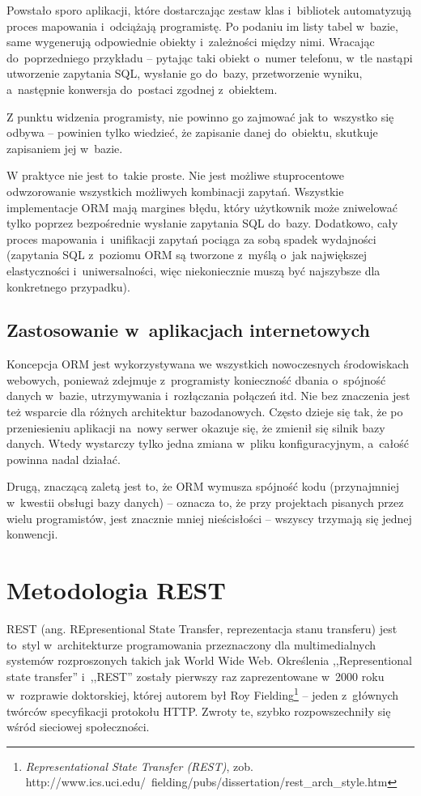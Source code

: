 \documentclass[a4paper,12pt,oneside]{report}
\begin{document}
Powstało sporo aplikacji, które dostarczając zestaw klas i~bibliotek automatyzują proces mapowania i~odciążają programistę. Po podaniu im listy tabel w~bazie, same wygenerują odpowiednie obiekty i~zależności między nimi. Wracając do~poprzedniego przykładu -- pytając taki obiekt o~numer telefonu, w~tle nastąpi utworzenie zapytania SQL, wysłanie go do~bazy, przetworzenie wyniku, a~następnie konwersja do~postaci zgodnej z~obiektem.

Z punktu widzenia programisty, nie powinno go zajmować jak to~wszystko się odbywa -- powinien tylko wiedzieć, że zapisanie danej do~obiektu, skutkuje zapisaniem jej w~bazie.

W praktyce nie jest to~takie proste. Nie jest możliwe stuprocentowe odwzorowanie wszystkich możliwych kombinacji zapytań. Wszystkie implementacje ORM mają margines błędu, który użytkownik może zniwelować tylko poprzez bezpośrednie wysłanie zapytania SQL do~bazy. Dodatkowo, cały proces mapowania i~unifikacji zapytań pociąga za sobą spadek wydajności (zapytania SQL z~poziomu ORM są tworzone z~myślą o~jak największej elastyczności i~uniwersalności, więc niekoniecznie muszą być najszybsze dla konkretnego przypadku).

\subsection{Zastosowanie w~aplikacjach internetowych}
\label{subsec:orm-web}
Koncepcja ORM jest wykorzystywana we wszystkich nowoczesnych środowiskach webowych, ponieważ zdejmuje z~programisty konieczność dbania o~spójność danych w~bazie, utrzymywania i~rozłączania połączeń itd. Nie bez znaczenia jest też wsparcie dla różnych architektur bazodanowych. Często dzieje się tak, że po przeniesieniu aplikacji na~nowy serwer okazuje się, że zmienił się silnik bazy danych. Wtedy wystarczy tylko jedna zmiana w~pliku konfiguracyjnym, a~całość powinna nadal działać.

Drugą, znaczącą zaletą jest to, że ORM wymusza spójność kodu (przynajmniej w~kwestii obsługi bazy danych) -- oznacza to, że przy projektach pisanych przez wielu programistów, jest znacznie mniej nieścisłości -- wszyscy trzymają się jednej konwencji.

\section{Metodologia REST}
\label{sec:rest}
REST (ang. REpresentional State Transfer, reprezentacja stanu transferu) jest to~styl w~architekturze programowania przeznaczony dla multimedialnych systemów rozproszonych takich jak World Wide Web. Określenia ,,Representional state transfer'' i~,,REST'' zostały pierwszy raz zaprezentowane w~2000 roku w~rozprawie doktorskiej, której autorem był Roy Fielding\footnote{\emph{Representational State Transfer (REST)}, zob. http://www.ics.uci.edu/~fielding/pubs/dissertation/rest\_arch\_style.htm} -- jeden z~głównych twórców specyfikacji protokołu HTTP. Zwroty te, szybko rozpowszechniły się wśród sieciowej społeczności.
\end{document}
